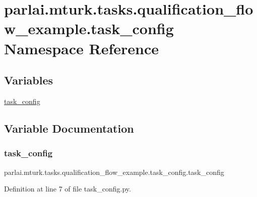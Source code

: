 \hypertarget{namespaceparlai_1_1mturk_1_1tasks_1_1qualification__flow__example_1_1task__config}{}\section{parlai.\+mturk.\+tasks.\+qualification\+\_\+flow\+\_\+example.\+task\+\_\+config Namespace Reference}
\label{namespaceparlai_1_1mturk_1_1tasks_1_1qualification__flow__example_1_1task__config}
\subsection*{Variables}
\begin{DoxyCompactItemize}
\item 
\hyperlink{namespaceparlai_1_1mturk_1_1tasks_1_1qualification__flow__example_1_1task__config_a87df04d35c96022f0e5a6a1371daad02}{task\+\_\+config}
\end{DoxyCompactItemize}


\subsection{Variable Documentation}
\mbox{\label{namespaceparlai_1_1mturk_1_1tasks_1_1qualification__flow__example_1_1task__config_a87df04d35c96022f0e5a6a1371daad02}} 
\subsubsection{\texorpdfstring{task\+\_\+config}{task\_config}}
{\footnotesize\ttfamily parlai.\+mturk.\+tasks.\+qualification\+\_\+flow\+\_\+example.\+task\+\_\+config.\+task\+\_\+config}



Definition at line 7 of file task\+\_\+config.\+py.

